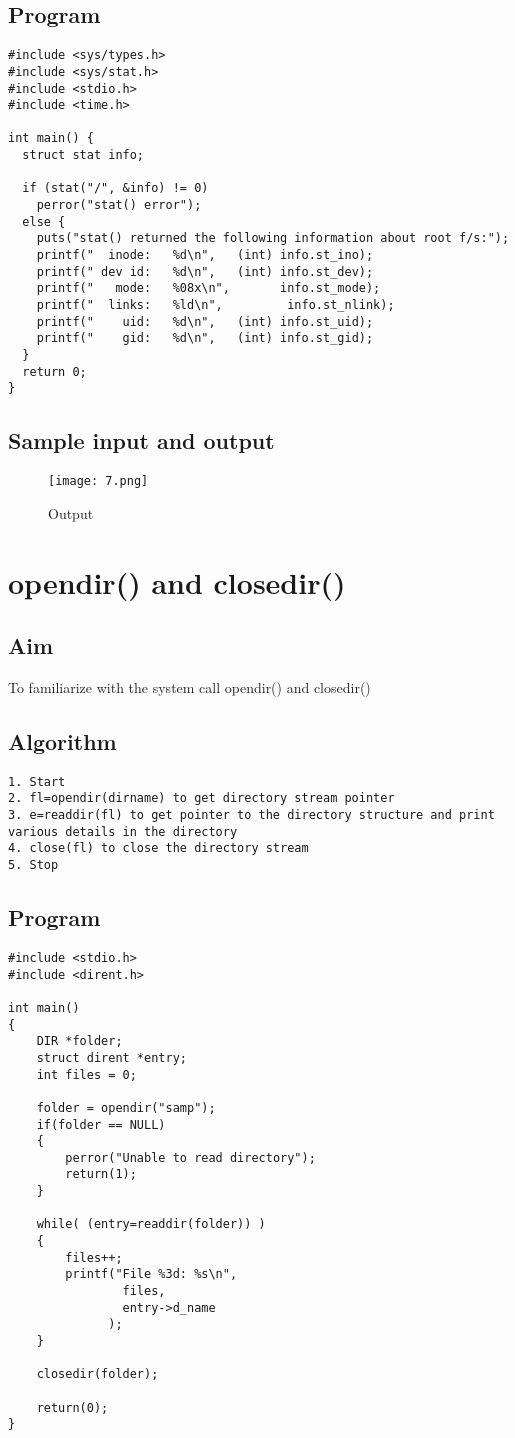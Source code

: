 \documentclass{article}
\begin{document}
\subsection{Program}
\begin{Verbatim}[tabsize = 4]
#include <sys/types.h>
#include <sys/stat.h>
#include <stdio.h>
#include <time.h>

int main() {
  struct stat info;

  if (stat("/", &info) != 0)
    perror("stat() error");
  else {
    puts("stat() returned the following information about root f/s:");
    printf("  inode:   %d\n",   (int) info.st_ino);
    printf(" dev id:   %d\n",   (int) info.st_dev);
    printf("   mode:   %08x\n",       info.st_mode);
    printf("  links:   %ld\n",         info.st_nlink);
    printf("    uid:   %d\n",   (int) info.st_uid);
    printf("    gid:   %d\n",   (int) info.st_gid);
  }
  return 0;
}
\end{Verbatim}
\subsection{Sample input and output}
\thispagestyle{third}
\begin{figure}[H]
    \centering
    \texttt{[image: 7.png]}
    \caption{Output}
    \label{fig:my_label2}
\end{figure}
\section{\Large opendir() and closedir() }
\subsection{Aim}
To familiarize with the system call opendir() and closedir()
\subsection{Algorithm}
\begin{Verbatim}[tabsize = 4]
1. Start
2. fl=opendir(dirname) to get directory stream pointer
3. e=readdir(fl) to get pointer to the directory structure and print 
various details in the directory
4. close(fl) to close the directory stream
5. Stop
\end{Verbatim}
\subsection{Program}
\begin{Verbatim}[tabsize = 4]
#include <stdio.h>
#include <dirent.h>

int main()
{
    DIR *folder;
    struct dirent *entry;
    int files = 0;

    folder = opendir("samp");
    if(folder == NULL)
    {
        perror("Unable to read directory");
        return(1);
    }

    while( (entry=readdir(folder)) )
    {
        files++;
        printf("File %3d: %s\n",
                files,
                entry->d_name
              );
    }

    closedir(folder);

    return(0);
}
\end{Verbatim}
\thispagestyle{third}
\end{document}
